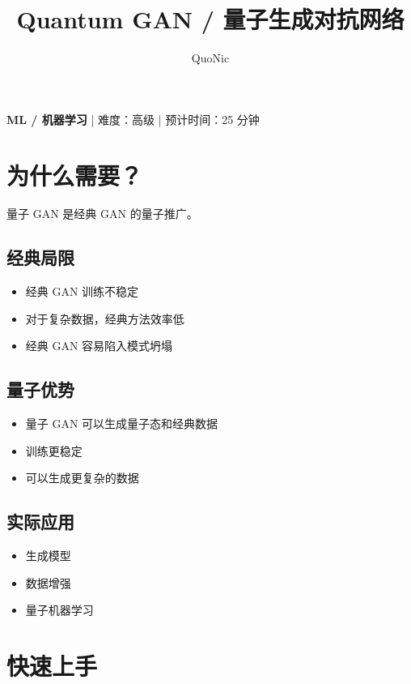 \documentclass[12pt,a4paper]{article}
\title{Quantum GAN / 量子生成对抗网络}
\author{QuoNic}
\date{}
\begin{document}
\maketitle

\begin{center}
\textbf{ML / 机器学习} | 难度：高级 | 预计时间：25 分钟
\end{center}

\tableofcontents
\newpage

\section{为什么需要？}

量子 GAN 是经典 GAN 的量子推广。

\subsection{经典局限}
\begin{itemize}
  \item 经典 GAN 训练不稳定
  \item 对于复杂数据，经典方法效率低
  \item 经典 GAN 容易陷入模式坍塌
\end{itemize}

\subsection{量子优势}
\begin{itemize}
  \item 量子 GAN 可以生成量子态和经典数据
  \item 训练更稳定
  \item 可以生成更复杂的数据
\end{itemize}

\subsection{实际应用}
\begin{itemize}
  \item 生成模型
  \item 数据增强
  \item 量子机器学习
\end{itemize}

\section{快速上手}
\end{document}

